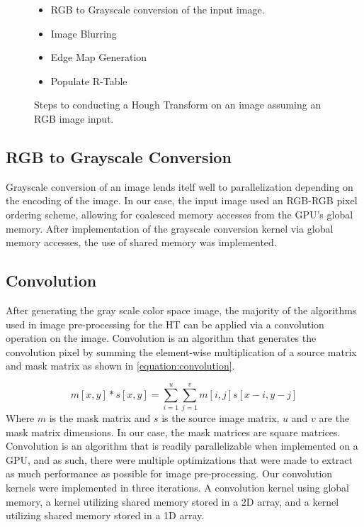 \documentclass[conference]{IEEEtran}
\begin{document}
\begin{figure}[h]
  \begin{itemize}
    \item RGB to Grayscale conversion of the input image.
    \item Image Blurring 
    \item Edge Map Generation
    \item Populate R-Table
  \end{itemize}\caption{Steps to conducting a Hough Transform on an image assuming an RGB image input.}\label{figure:hough-transform-steps}
\end{figure}



\subsection{RGB to Grayscale Conversion}
Grayscale conversion of an image lends itelf well to parallelization depending on the encoding of the image.
In our case, the input image used an RGB-RGB pixel ordering scheme, allowing for coalesced memory accesses from the GPU's global memory.
After implementation of the grayscale conversion kernel via global memory accesses, the use of shared memory was implemented.



\subsection{Convolution}
After generating the gray scale color space image, the majority of the algorithms used in image pre-processing for the HT can be applied via a convolution operation on the image.
Convolution is an algorithm that generates the convolution pixel by summing the element-wise multiplication of a source matrix and mask matrix as shown in \autoref{equation:convolution}.

\begin{equation}
  m[x,y] * s[x,y] = \sum\limits_{i = 1}^{u} \sum\limits_{j = 1}^{v} m[i,j]s[x-i, y-j]
  \label{equation:convolution}
\end{equation}
Where $m$ is the mask matrix and $s$ is the source image matrix, $u$ and $v$ are the mask matrix dimensions. In our case, the mask matrices are square matrices.
Convolution is an algorithm that is readily parallelizable when implemented on a GPU, and as such, there were multiple optimizations that were made to extract as much performance as possible for image pre-processing.
Our convolution kernels were implemented in three iterations. 
A convolution kernel using global memory, a kernel utilizing shared memory stored in a 2D array, and a kernel utilizing shared memory stored in a 1D array.
\end{document}
